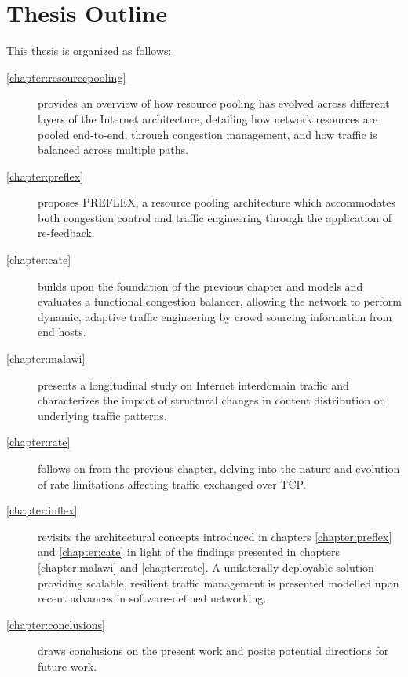 \section{Thesis Outline}
\label{sec:introduction:outline}

This thesis is organized as follows:

\renewcommand{\descriptionlabel}[1]{\hspace{\labelsep}\textbf{Chapter #1}}
\begin{description}
\item[\ref{chapter:resourcepooling}] provides an overview of how resource pooling has evolved across different layers of the Internet architecture, detailing how network resources are pooled end-to-end, through congestion management, and how traffic is balanced across multiple paths.
\item[\ref{chapter:preflex}] proposes \acs{PREFLEX}, a resource pooling architecture which accommodates both congestion control and traffic engineering through the application of re-feedback. 
\item[\ref{chapter:cate}] builds upon the foundation of the previous chapter and models and evaluates a functional congestion balancer, allowing the network to perform dynamic, adaptive traffic engineering by crowd sourcing information from end hosts.
\item[\ref{chapter:malawi}] presents a longitudinal study on Internet interdomain traffic and characterizes the impact of structural changes in content distribution on underlying traffic patterns.
\item[\ref{chapter:rate}] follows on from the previous chapter, delving into the nature and evolution of rate limitations affecting traffic exchanged over \ac{TCP}.
\item[\ref{chapter:inflex}] revisits the architectural concepts introduced in chapters \ref{chapter:preflex} and \ref{chapter:cate} in light of the findings presented in chapters \ref{chapter:malawi} and \ref{chapter:rate}.
A unilaterally deployable solution providing scalable, resilient traffic management is presented modelled upon recent advances in software-defined networking.
\item[\ref{chapter:conclusions}] draws conclusions on the present work and posits potential directions for future work.
\end{description}

